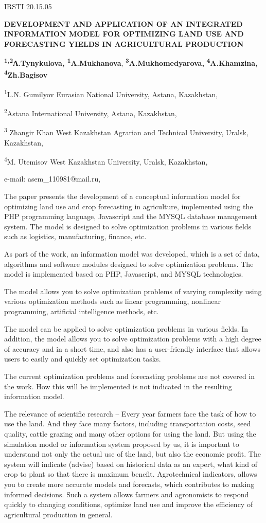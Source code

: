 IRSTI 20.15.05

{\bfseries DEVELOPMENT AND APPLICATION OF AN INTEGRATED INFORMATION MODEL
FOR OPTIMIZING LAND USE AND FORECASTING YIELDS IN AGRICULTURAL
PRODUCTION}

{\bfseries \textsuperscript{1,2}А.Tynykulova,
\textsuperscript{1}A.Mukhanova},
{\bfseries \textsuperscript{3}A.Mukhomedyarova,}
{\bfseries \textsuperscript{4}A.Khamzina, \textsuperscript{4}Zh.Bagisov}

\textsuperscript{1}L.N. Gumilyov Eurasian National University, Astana,
Kazakhstan,

\textsuperscript{2}Astana International University, Astana, Kazakhstan,

\textsuperscript{3} Zhangir Khan West Kazakhstan Agrarian and Technical
University, Uralsk, Kazakhstan,

\textsuperscript{4}M. Utemisov West Kazakhstan University, Uralsk,
Kazakhstan,

e-mail: asem\_110981@mail.ru,

The paper presents the development of a conceptual information model for
optimizing land use and crop forecasting in agriculture, implemented
using the PHP programming language, Javascript and the MYSQL database
management system. The model is designed to solve optimization problems
in various fields such as logistics, manufacturing, finance, etc.

As part of the work, an information model was developed, which is a set
of data, algorithms and software modules designed to solve optimization
problems. The model is implemented based on PHP, Javascript, and MYSQL
technologies.

The model allows you to solve optimization problems of varying
complexity using various optimization methods such as linear
programming, nonlinear programming, artificial intelligence methods,
etc.

The model can be applied to solve optimization problems in various
fields. In addition, the model allows you to solve optimization problems
with a high degree of accuracy and in a short time, and also has a
user-friendly interface that allows users to easily and quickly set
optimization tasks.

The current optimization problems and forecasting problems are not
covered in the work. How this will be implemented is not indicated in
the resulting information model.

The relevance of scientific research -- Every year farmers face the task
of how to use the land. And they face many factors, including
transportation costs, seed quality, cattle grazing and many other
options for using the land. But using the simulation model or
information system proposed by us, it is important to understand not
only the actual use of the land, but also the economic profit. The
system will indicate (advise) based on historical data as an expert,
what kind of crop to plant so that there is maximum benefit.
Agrotechnical indicators, allows you to create more accurate models and
forecasts, which contributes to making informed decisions. Such a system
allows farmers and agronomists to respond quickly to changing
conditions, optimize land use and improve the efficiency of agricultural
production in general.

